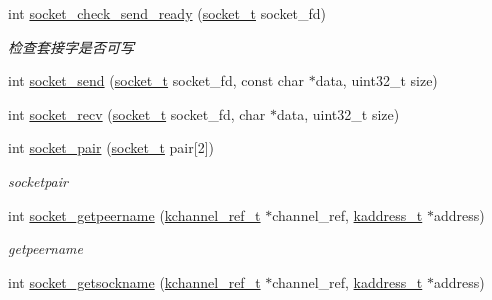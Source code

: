 \begin{DoxyCompactItemize}
\item 
int \hyperlink{a00084_a8afd26cc26824e35f1ec942d2c367c2b_a8afd26cc26824e35f1ec942d2c367c2b}{socket\+\_\+check\+\_\+send\+\_\+ready} (\hyperlink{a00053_a0d9e0afbf02fb6ed6c5b1415dce51b05_a0d9e0afbf02fb6ed6c5b1415dce51b05}{socket\+\_\+t} socket\+\_\+fd)
\begin{DoxyCompactList}\small\item\em 检查套接字是否可写 \end{DoxyCompactList}\item 
int \hyperlink{a00084_a1acbefba637d7c0c3fd77355f84d4c22_a1acbefba637d7c0c3fd77355f84d4c22}{socket\+\_\+send} (\hyperlink{a00053_a0d9e0afbf02fb6ed6c5b1415dce51b05_a0d9e0afbf02fb6ed6c5b1415dce51b05}{socket\+\_\+t} socket\+\_\+fd, const char $\ast$data, uint32\+\_\+t size)
\item 
int \hyperlink{a00084_a8a4b901f1586de59d1d0a88d3326c934_a8a4b901f1586de59d1d0a88d3326c934}{socket\+\_\+recv} (\hyperlink{a00053_a0d9e0afbf02fb6ed6c5b1415dce51b05_a0d9e0afbf02fb6ed6c5b1415dce51b05}{socket\+\_\+t} socket\+\_\+fd, char $\ast$data, uint32\+\_\+t size)
\item 
int \hyperlink{a00084_a64d681185ca861b010c81db7479e9e08_a64d681185ca861b010c81db7479e9e08}{socket\+\_\+pair} (\hyperlink{a00053_a0d9e0afbf02fb6ed6c5b1415dce51b05_a0d9e0afbf02fb6ed6c5b1415dce51b05}{socket\+\_\+t} pair\mbox{[}2\mbox{]})
\begin{DoxyCompactList}\small\item\em socketpair \end{DoxyCompactList}\item 
int \hyperlink{a00084_a644c735078e8cc74601a1ea5cc52a430_a644c735078e8cc74601a1ea5cc52a430}{socket\+\_\+getpeername} (\hyperlink{a00053_a3b7e82599367eade261456f60ebe2cd9_a3b7e82599367eade261456f60ebe2cd9}{kchannel\+\_\+ref\+\_\+t} $\ast$channel\+\_\+ref, \hyperlink{a00053_a44e99fab0348ec54cfee119ddd9ceed6_a44e99fab0348ec54cfee119ddd9ceed6}{kaddress\+\_\+t} $\ast$address)
\begin{DoxyCompactList}\small\item\em getpeername \end{DoxyCompactList}\item 
int \hyperlink{a00084_ae9d654d20270a5ee5db0c90334c08c38_ae9d654d20270a5ee5db0c90334c08c38}{socket\+\_\+getsockname} (\hyperlink{a00053_a3b7e82599367eade261456f60ebe2cd9_a3b7e82599367eade261456f60ebe2cd9}{kchannel\+\_\+ref\+\_\+t} $\ast$channel\+\_\+ref, \hyperlink{a00053_a44e99fab0348ec54cfee119ddd9ceed6_a44e99fab0348ec54cfee119ddd9ceed6}{kaddress\+\_\+t} $\ast$address)

\end{DoxyCompactItemize}
